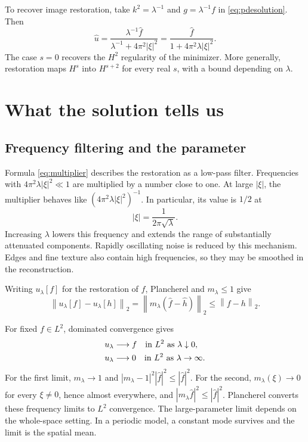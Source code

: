 \documentclass[11pt]{article}
\numberwithin{equation}{section}
\theoremstyle{definition}
\theoremstyle{remark}
\newcommand{\norm}[1]{\left\|#1\right\|}
\newcommand{\wh}[1]{\widehat{#1}}
\begin{document}
To recover image restoration, take \(k^2=\lambda^{-1}\) and \(g=\lambda^{-1}f\) in \eqref{eq:pdesolution}. Then
\[
 \wh u=\frac{\lambda^{-1}\wh f}{\lambda^{-1}+4\pi^2|\xi|^2}
       =\frac{\wh f}{1+4\pi^2\lambda|\xi|^2}.
\]
The case \(s=0\) recovers the \(H^2\) regularity of the minimizer. More generally, restoration maps \(H^s\) into \(H^{s+2}\) for every real \(s\), with a bound depending on \(\lambda\).

\section{What the solution tells us}\label{sec:meaning}
\subsection{Frequency filtering and the parameter}
Formula \eqref{eq:multiplier} describes the restoration as a low-pass filter. Frequencies with \(4\pi^2\lambda|\xi|^2\ll1\) are multiplied by a number close to one. At large \(|\xi|\), the multiplier behaves like \((4\pi^2\lambda|\xi|^2)^{-1}\). In particular, its value is \(1/2\) at
\[
 |\xi|=\frac1{2\pi\sqrt\lambda}.
\]
Increasing \(\lambda\) lowers this frequency and extends the range of substantially attenuated components. Rapidly oscillating noise is reduced by this mechanism. Edges and fine texture also contain high frequencies, so they may be smoothed in the reconstruction.

Writing \(u_\lambda[f]\) for the restoration of \(f\), Plancherel and \(m_\lambda\le1\) give
\begin{equation}\label{eq:contraction}
 \norm{u_\lambda[f]-u_\lambda[h]}_2
       =\norm{m_\lambda(\wh f-\wh h)}_2
       \le\norm{f-h}_2.
\end{equation}

For fixed \(f\in L^2\), dominated convergence gives
\begin{align}
 u_\lambda&\longrightarrow f\quad\text{in }L^2\text{ as }\lambda\downarrow0,\label{eq:parameterlimits}\\
 u_\lambda&\longrightarrow0\quad\text{in }L^2\text{ as }\lambda\to\infty.\notag
\end{align}
For the first limit, \(m_\lambda\to1\) and
\(|m_\lambda-1|^2|\wh f|^2\le|\wh f|^2\). For the second, \(m_\lambda(\xi)\to0\) for every \(\xi\ne0\), hence almost everywhere, and \(|m_\lambda\wh f|^2\le|\wh f|^2\). Plancherel converts these frequency limits to \(L^2\) convergence. The large-parameter limit depends on the whole-space setting. In a periodic model, a constant mode survives and the limit is the spatial mean.
\end{document}
